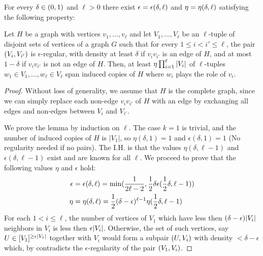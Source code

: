         \begin{lemma} \label{lem:H_like_partition_implies_H_abundance}
            For every $\delta \in ( 0, 1 )$ and $\ell > 0$ there exist $\epsilon = \epsilon ( \delta, \ell )$ and
            $\eta = \eta ( \delta, \ell )$ satisfying the following property:

            Let $H$ be a graph with vertices $v_1, \dots,v_\ell$ and let $V_1, \dots, V_\ell$ be an $\ell$-tuple of disjoint
            sets of vertices of a graph $G$ such that for every $1 \leq i < i' \leq \ell$, the pair $( V_i, V_{i'} )$
            is $\epsilon$-regular, with density at least $\delta$ if $v_i v_{i'}$ is an edge of $H$, and at most $1 - \delta$
            if $v_i v_{i'}$ is not an edge of $H$.
            Then, at least $\eta \prod_{i=1}^\ell | V_i |$ of $\ell$-tuples $w_1 \in V_1, \dots, w_\ell \in V_\ell$
            span induced copies of $H$ where $w_i$ plays the role of $v_i$.
            \begin{proof}
                Without loss of generality, we assume that $H$ is the complete graph, since we can simply replace each non-edge
                $v_i v_{i'}$ of $H$ with an edge by exchanging all edges and non-edges between $V_i$ and $V_{i'}$.

                We prove the lemma by induction on $\ell$.
                The case $k=1$ is trivial, and the number of induced copies of $H$ is $|V_1|$, so $\eta(\delta, 1) = 1$ and
                $\epsilon(\delta, 1) = 1$ (No regularity needed if no pairs).
                The I.H. is that the values $\eta(\delta, \ell-1)$ and $\epsilon(\delta, \ell-1)$ exist and are known for all
                $\ell$.
                We proceed to prove that the following values $\eta$ and $\epsilon$ hold:
                \begin{align*}
                    \epsilon &= \epsilon(\delta, \ell)
                        = \min ( \frac{1}{2\ell - 2}, \frac{1}{2} \delta \epsilon(\frac{1}{2}\delta, \ell-1) ) \\
                    \eta &= \eta(\delta, \ell)
                        = \frac{1}{2} (\delta - \epsilon)^{\ell-1} \eta(\frac{1}{2}\delta, \ell-1)
                \end{align*}
                For each $1 < i \leq \ell$, the number of vertices of $V_1$ which have less then
                $(\delta - \epsilon) | V_i |$ neighbors in $V_i$ is less then $\epsilon | V_i |$.
                Otherwise, the set of such vertices, say $U \in [V_1]^{\geq \epsilon | V_1 |}$ together with $V_i$
                would form a subpair $( U, V_i )$ with density $< \delta - \epsilon$ which, by
                 contradicts the $\epsilon$-regularity of the pair $( V_1, V_i )$.


\end{proof}
\end{lemma}
